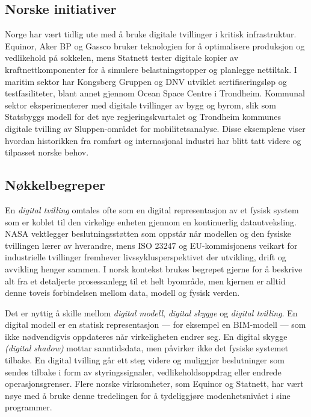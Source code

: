 \subsection{Norske initiativer}
Norge har vært tidlig ute med å bruke digitale tvillinger i kritisk infrastruktur. Equinor, Aker BP og Gassco bruker teknologien for å optimalisere produksjon og vedlikehold på sokkelen, mens Statnett tester digitale kopier av kraftnettkomponenter for å simulere belastningstopper og planlegge nettiltak. I maritim sektor har Kongsberg Gruppen og DNV utviklet sertifiseringsløp og testfasiliteter, blant annet gjennom Ocean Space Centre i Trondheim. Kommunal sektor eksperimenterer med digitale tvillinger av bygg og byrom, slik som Statsbyggs modell for det nye regjeringskvartalet og Trondheim kommunes digitale tvilling av Sluppen-området for mobilitetsanalyse. Disse eksemplene viser hvordan historikken fra romfart og internasjonal industri har blitt tatt videre og tilpasset norske behov.

\subsection{Nøkkelbegreper}
En \emph{digital tvilling} omtales ofte som en digital representasjon av et fysisk system som er koblet til den virkelige enheten gjennom en kontinuerlig datautveksling. NASA vektlegger beslutningsstøtten som oppstår når modellen og den fysiske tvillingen lærer av hverandre, mens ISO 23247 og EU-kommisjonens veikart for industrielle tvillinger fremhever livssyklusperspektivet der utvikling, drift og avvikling henger sammen. I norsk kontekst brukes begrepet gjerne for å beskrive alt fra et detaljerte prosessanlegg til et helt byområde, men kjernen er alltid denne toveis forbindelsen mellom data, modell og fysisk verden.

Det er nyttig å skille mellom \emph{digital modell}, \emph{digital skygge} og \emph{digital tvilling}. En digital modell er en statisk representasjon --- for eksempel en BIM-modell --- som ikke nødvendigvis oppdateres når virkeligheten endrer seg. En digital skygge \textit{(digital shadow)} mottar sanntidsdata, men påvirker ikke det fysiske systemet tilbake. En digital tvilling går ett steg videre og muliggjør beslutninger som sendes tilbake i form av styringssignaler, vedlikeholdsoppdrag eller endrede operasjonsgrenser. Flere norske virksomheter, som Equinor og Statnett, har vært nøye med å bruke denne tredelingen for å tydeliggjøre modenhetsnivået i sine programmer.

